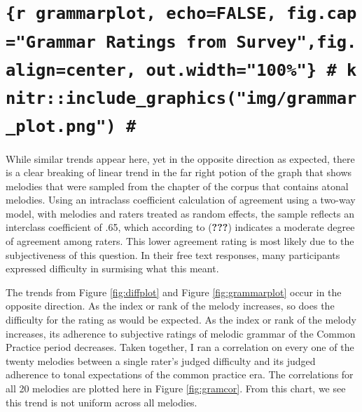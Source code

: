 \documentclass[english,man,floatsintext]{apa6}
\begin{document}
\hypertarget{r-grammarplot-echofalse-fig.capgrammar-ratings-from-surveyfig.aligncenter-out.width100-knitrinclude_graphicsimggrammar_plot.png}{%
\section{\texorpdfstring{\texttt{\{r\ grammarplot,\ echo=FALSE,\ fig.cap="Grammar\ Ratings\ from\ Survey",fig.align=\textquotesingle{}center\textquotesingle{},\ out.width="100\%"\}\ \#\ knitr::include\_graphics("img/grammar\_plot.png")\ \#}}{\{r grammarplot, echo=FALSE, fig.cap="Grammar Ratings from Survey",fig.align='center', out.width="100\%"\} \# knitr::include\_graphics("img/grammar\_plot.png") \#}}\label{r-grammarplot-echofalse-fig.capgrammar-ratings-from-surveyfig.aligncenter-out.width100-knitrinclude_graphicsimggrammar_plot.png}}

While similar trends appear here, yet in the opposite direction as expected, there is a clear breaking of linear trend in the far right potion of the graph that shows melodies that were sampled from the chapter of the corpus that contains atonal melodies.
Using an intraclass coefficient calculation of agreement using a two-way model, with melodies and raters treated as random effects, the sample reflects an interclass coefficient of .65, which according to ({\textbf{???}}) indicates a moderate degree of agreement among raters.
This lower agreement rating is most likely due to the subjectiveness of this question.
In their free text responses, many participants expressed difficulty in surmising what this meant.

The trends from Figure \ref{fig:diffplot} and Figure \ref{fig:grammarplot} occur in the opposite direction.
As the index or rank of the melody increases, so does the difficulty for the rating as would be expected.
As the index or rank of the melody increases, its adherence to subjective ratings of melodic grammar of the Common Practice period decreases.
Taken together, I ran a correlation on every one of the twenty melodies between a single rater's judged difficulty and its judged adherence to tonal expectations of the common practice era.
The correlations for all 20 melodies are plotted here in Figure \ref{fig:gramcor}.
From this chart, we see this trend is not uniform across all melodies.
\end{document}

